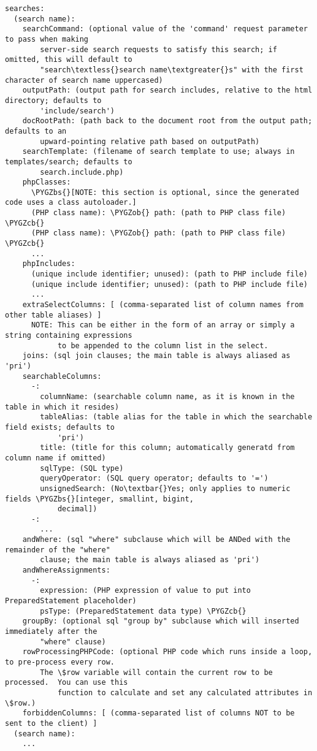 \documentclass[letterpaper,10pt,english]{sphinxmanual}
\def\PYGZbs{\char`\\}
\def\PYGZob{\char`\{}
\def\PYGZcb{\char`\}}
\begin{document}
\begin{Verbatim}[commandchars=\\\{\}]
searches:
  (search name):
    searchCommand: (optional value of the 'command' request parameter to pass when making
        server-side search requests to satisfy this search; if omitted, this will default to
        "search\textless{}search name\textgreater{}s" with the first character of search name uppercased)
    outputPath: (output path for search includes, relative to the html directory; defaults to
        'include/search')
    docRootPath: (path back to the document root from the output path; defaults to an
        upward-pointing relative path based on outputPath)
    searchTemplate: (filename of search template to use; always in templates/search; defaults to
        search.include.php)
    phpClasses:
      \PYGZbs{}[NOTE: this section is optional, since the generated code uses a class autoloader.]
      (PHP class name): \PYGZob{} path: (path to PHP class file) \PYGZcb{}
      (PHP class name): \PYGZob{} path: (path to PHP class file) \PYGZcb{}
      ...
    phpIncludes:
      (unique include identifier; unused): (path to PHP include file)
      (unique include identifier; unused): (path to PHP include file)
      ...
    extraSelectColumns: [ (comma-separated list of column names from other table aliases) ]
      NOTE: This can be either in the form of an array or simply a string containing expressions
            to be appended to the column list in the select.
    joins: (sql join clauses; the main table is always aliased as 'pri')
    searchableColumns:
      -:
        columnName: (searchable column name, as it is known in the table in which it resides)
        tableAlias: (table alias for the table in which the searchable field exists; defaults to
            'pri')
        title: (title for this column; automatically generatd from column name if omitted)
        sqlType: (SQL type)
        queryOperator: (SQL query operator; defaults to '=')
        unsignedSearch: (No\textbar{}Yes; only applies to numeric fields \PYGZbs{}[integer, smallint, bigint,
            decimal])
      -:
        ...
    andWhere: (sql "where" subclause which will be ANDed with the remainder of the "where"
        clause; the main table is always aliased as 'pri')
    andWhereAssignments:
      -:
        expression: (PHP expression of value to put into PreparedStatement placeholder)
        psType: (PreparedStatement data type) \PYGZcb{}
    groupBy: (optional sql "group by" subclause which will inserted immediately after the
        "where" clause)
    rowProcessingPHPCode: (optional PHP code which runs inside a loop, to pre-process every row.
        The \$row variable will contain the current row to be processed.  You can use this
            function to calculate and set any calculated attributes in \$row.)
    forbiddenColumns: [ (comma-separated list of columns NOT to be sent to the client) ]
  (search name):
    ...
\end{Verbatim}
\end{document}
